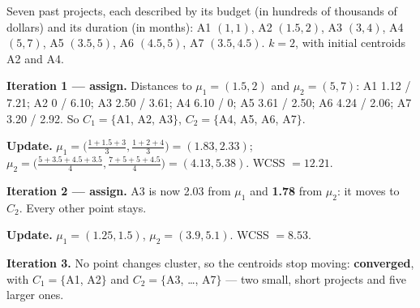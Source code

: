 \begin{worked}
Seven past projects, each described by its budget (in hundreds of thousands of
dollars) and its duration (in months): A1 $(1, 1)$, A2 $(1.5, 2)$, A3 $(3, 4)$,
A4 $(5, 7)$, A5 $(3.5, 5)$, A6 $(4.5, 5)$, A7 $(3.5, 4.5)$. $k = 2$, with initial
centroids A2 and A4.

\smallskip
\textbf{Iteration 1 --- assign.} Distances to $\mu_1 = (1.5, 2)$ and $\mu_2 = (5, 7)$:
A1 1.12 / 7.21; A2 0 / 6.10; A3 2.50 / 3.61; A4 6.10 / 0; A5 3.61 / 2.50;
A6 4.24 / 2.06; A7 3.20 / 2.92. So $C_1 = \{$A1, A2, A3$\}$, $C_2 = \{$A4, A5, A6, A7$\}$.

\textbf{Update.} $\mu_1 = \big(\tfrac{1+1.5+3}{3}, \tfrac{1+2+4}{3}\big) = (1.83, 2.33)$;
$\mu_2 = \big(\tfrac{5+3.5+4.5+3.5}{4}, \tfrac{7+5+5+4.5}{4}\big) = (4.13, 5.38)$.
WCSS $= 12.21$.

\smallskip
\textbf{Iteration 2 --- assign.} A3 is now 2.03 from $\mu_1$ and \textbf{1.78} from
$\mu_2$: it moves to $C_2$. Every other point stays.

\textbf{Update.} $\mu_1 = (1.25, 1.5)$, $\mu_2 = (3.9, 5.1)$. WCSS $= 8.53$.

\smallskip
\textbf{Iteration 3.} No point changes cluster, so the centroids stop moving:
\textbf{converged}, with $C_1 = \{$A1, A2$\}$ and $C_2 = \{$A3, \dots, A7$\}$ ---
two small, short projects and five larger ones.
\end{worked}

